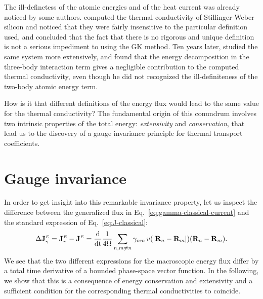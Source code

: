 \begin{LEtext}
The ill-definetess of the atomic energies and of the heat current was already noticed by some authors. \citet{Schelling2002} computed the thermal conductivity of Stillinger-Weber \cite{Stillinger1985} silicon and noticed that they were fairly insensitive to the particular definition used, and concluded that the fact that there is no rigorous and unique definition is not a serious impediment to using the GK method. Ten years later, \citet{Howell2012} studied the same system more extensively, and found that the energy decomposition in the three-body interaction term gives a negligible contribution to the computed thermal conductivity, even though he did not recognized the ill-definiteness of the two-body atomic energy term.

How is it that different definitions of the energy flux would lead to the same value for the thermal conductivity? The fundamental origin of this conundrum involves two intrinsic properties of the total energy: \emph{extensivity} and \emph{conservation}, that lead us to the discovery of a gauge invariance principle for thermal transport coefficients.
\end{LEtext}


\section{Gauge invariance}

In order to get insight into this remarkable invariance property, let us inspect the difference between the generalized flux in Eq.~\eqref{eq:gamma-classical-current} and the standard expression of Eq.~\eqref{eq:J-classical}:
\begin{equation}
  \rDelta\mathbf{J}^\smallE_{\smallgamma} =\mathbf{J}^\smallE_{\smallgamma}-\mathbf{J}^\smallE  =\frac{\mathrm{d}}{\mathrm{dt}}\frac{1}{4 \rOmega} \sum_{n,m\ne n}  \gamma_{nm} \, v(|\mathbf{R}_{n}-\mathbf{R}_{m}|)  (\mathbf{R}_{n}-\mathbf{R}_{m}). \label{eq:DeltaJ}
\end{equation}
We see that the two different expressions for the macroscopic energy flux differ by a total time derivative of a bounded phase-space vector function. In the following, we show that this is a consequence of energy conservation and extensivity and a sufficient condition for the corresponding thermal conductivities to coincide.

